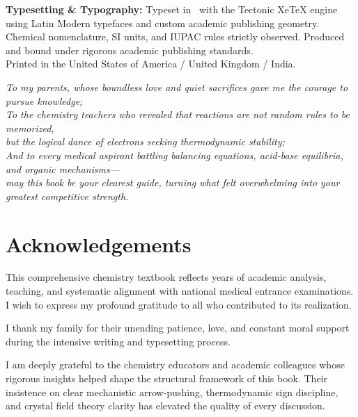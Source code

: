 \documentclass[10pt,twoside,openright]{book}
\begin{document}
\begin{flushleft}
{\textbf{Typesetting \& Typography:} Typeset in \LaTeXe\ with the Tectonic XeTeX engine using Latin Modern typefaces and custom academic publishing geometry. Chemical nomenclature, SI units, and IUPAC rules strictly observed. Produced and bound under rigorous academic publishing standards.\\[4pt]
Printed in the United States of America / United Kingdom / India.
}
\end{flushleft}
\cleardoublepage

\thispagestyle{empty}
\vspace*{5cm}
\begin{center}
  \itshape\large
  To my parents, whose boundless love and quiet sacrifices gave me the courage to pursue knowledge;\\
  \vspace{1.2cm}
  To the chemistry teachers who revealed that reactions are not random rules to be memorized,\\
  but the logical dance of electrons seeking thermodynamic stability;\\
  \vspace{1.2cm}
  And to every medical aspirant battling balancing equations, acid-base equilibria, and organic mechanisms---\\
  may this book be your clearest guide, turning what felt overwhelming into your greatest competitive strength.
\end{center}
\cleardoublepage

\chapter*{Acknowledgements}

This comprehensive chemistry textbook reflects years of academic analysis, teaching, and systematic alignment with national medical entrance examinations. I wish to express my profound gratitude to all who contributed to its realization.

I thank my family for their unending patience, love, and constant moral support during the intensive writing and typesetting process.

I am deeply grateful to the chemistry educators and academic colleagues whose rigorous insights helped shape the structural framework of this book. Their insistence on clear mechanistic arrow-pushing, thermodynamic sign discipline, and crystal field theory clarity has elevated the quality of every discussion.
\end{document}
